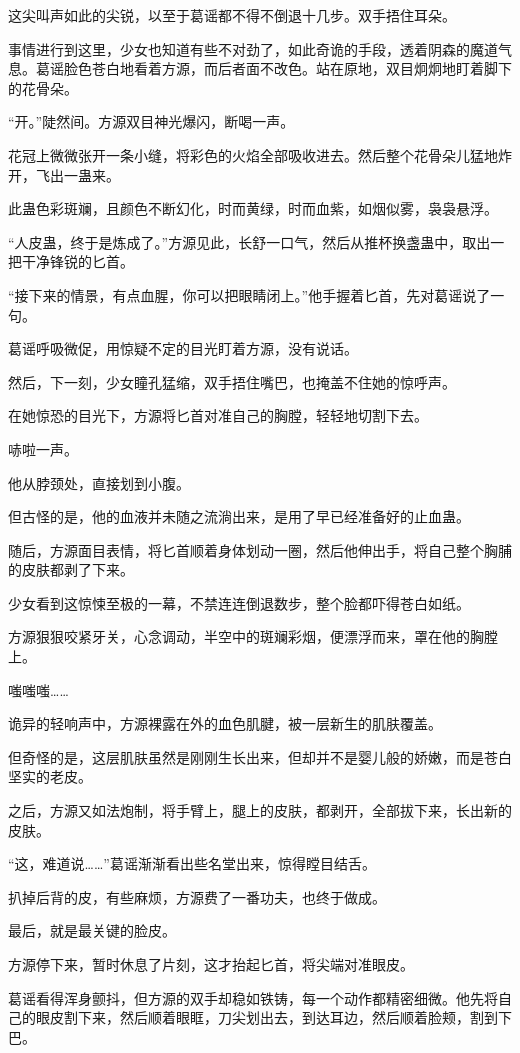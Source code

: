 \begin{this_body}
这尖叫声如此的尖锐，以至于葛谣都不得不倒退十几步。双手捂住耳朵。

事情进行到这里，少女也知道有些不对劲了，如此奇诡的手段，透着阴森的魔道气息。葛谣脸色苍白地看着方源，而后者面不改色。站在原地，双目炯炯地盯着脚下的花骨朵。

“开。”陡然间。方源双目神光爆闪，断喝一声。

花冠上微微张开一条小缝，将彩色的火焰全部吸收进去。然后整个花骨朵儿猛地炸开，飞出一蛊来。

此蛊色彩斑斓，且颜色不断幻化，时而黄绿，时而血紫，如烟似雾，袅袅悬浮。

“人皮蛊，终于是炼成了。”方源见此，长舒一口气，然后从推杯换盏蛊中，取出一把干净锋锐的匕首。

“接下来的情景，有点血腥，你可以把眼睛闭上。”他手握着匕首，先对葛谣说了一句。

葛谣呼吸微促，用惊疑不定的目光盯着方源，没有说话。

然后，下一刻，少女瞳孔猛缩，双手捂住嘴巴，也掩盖不住她的惊呼声。

在她惊恐的目光下，方源将匕首对准自己的胸膛，轻轻地切割下去。

哧啦一声。

他从脖颈处，直接划到小腹。

但古怪的是，他的血液并未随之流淌出来，是用了早已经准备好的止血蛊。

随后，方源面目表情，将匕首顺着身体划动一圈，然后他伸出手，将自己整个胸脯的皮肤都剥了下来。

少女看到这惊悚至极的一幕，不禁连连倒退数步，整个脸都吓得苍白如纸。

方源狠狠咬紧牙关，心念调动，半空中的斑斓彩烟，便漂浮而来，罩在他的胸膛上。

嗤嗤嗤……

诡异的轻响声中，方源裸露在外的血色肌腱，被一层新生的肌肤覆盖。

但奇怪的是，这层肌肤虽然是刚刚生长出来，但却并不是婴儿般的娇嫩，而是苍白坚实的老皮。

之后，方源又如法炮制，将手臂上，腿上的皮肤，都剥开，全部拔下来，长出新的皮肤。

“这，难道说……”葛谣渐渐看出些名堂出来，惊得瞠目结舌。

扒掉后背的皮，有些麻烦，方源费了一番功夫，也终于做成。

最后，就是最关键的脸皮。

方源停下来，暂时休息了片刻，这才抬起匕首，将尖端对准眼皮。

葛谣看得浑身颤抖，但方源的双手却稳如铁铸，每一个动作都精密细微。他先将自己的眼皮割下来，然后顺着眼眶，刀尖划出去，到达耳边，然后顺着脸颊，割到下巴。


\end{this_body}
